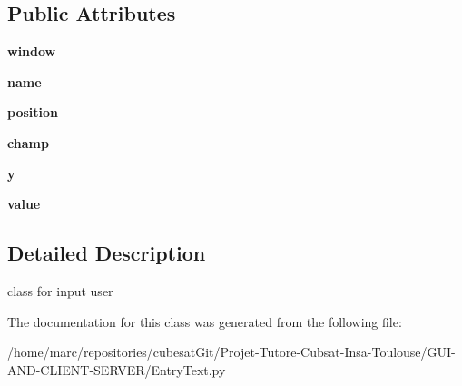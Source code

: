 \subsection*{Public Attributes}
\begin{DoxyCompactItemize}
\item 
\hypertarget{classEntryText_1_1EntryText_a0a16866dc494a51bf277be331e770973}{{\bfseries window}}\label{classEntryText_1_1EntryText_a0a16866dc494a51bf277be331e770973}

\item 
\hypertarget{classEntryText_1_1EntryText_af3b56e75559c38826087608d7ad0a219}{{\bfseries name}}\label{classEntryText_1_1EntryText_af3b56e75559c38826087608d7ad0a219}

\item 
\hypertarget{classEntryText_1_1EntryText_a0d431291077da8a406d74e19102f5b13}{{\bfseries position}}\label{classEntryText_1_1EntryText_a0d431291077da8a406d74e19102f5b13}

\item 
\hypertarget{classEntryText_1_1EntryText_a8f54c9fee0f57bac6508a0b153d35350}{{\bfseries champ}}\label{classEntryText_1_1EntryText_a8f54c9fee0f57bac6508a0b153d35350}

\item 
\hypertarget{classEntryText_1_1EntryText_a04dc0d7a0f8607d43753d2f6bbfbb204}{{\bfseries y}}\label{classEntryText_1_1EntryText_a04dc0d7a0f8607d43753d2f6bbfbb204}

\item 
\hypertarget{classEntryText_1_1EntryText_a943152643b1f49e3f4e318752b37edae}{{\bfseries value}}\label{classEntryText_1_1EntryText_a943152643b1f49e3f4e318752b37edae}

\end{DoxyCompactItemize}


\subsection{Detailed Description}
\begin{DoxyVerb}class for input user \end{DoxyVerb}
 

The documentation for this class was generated from the following file\+:\begin{DoxyCompactItemize}
\item 
/home/marc/repositories/cubesat\+Git/\+Projet-\/\+Tutore-\/\+Cubsat-\/\+Insa-\/\+Toulouse/\+G\+U\+I-\/\+A\+N\+D-\/\+C\+L\+I\+E\+N\+T-\/\+S\+E\+R\+V\+E\+R/Entry\+Text.\+py\end{DoxyCompactItemize}
